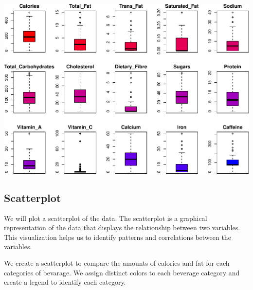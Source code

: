 \documentclass[
]{article}
\begin{document}
\begin{center}\includegraphics{Statistical_Learning_Final_Report_files/figure-latex/boxplot-1} \end{center}

\subsection{Scatterplot}\label{scatterplot}

We will plot a scatterplot of the data. The scatterplot is a graphical
representation of the data that displays the relationship between two
variables. This visualization helps us to identify patterns and
correlations between the variables.

We create a scatterplot to compare the amounts of calories and fat for
each categories of bevarage. We assign distinct colors to each beverage
category and create a legend to identify each category.
\end{document}
